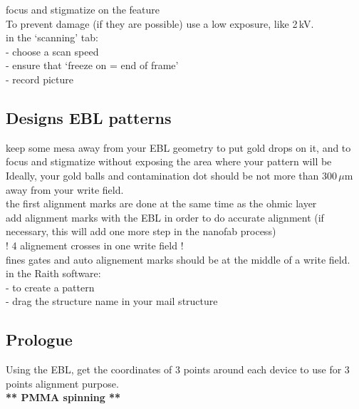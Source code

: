 \documentclass[12pt,a4paper]{report}
\begin{document}
\begin{enumerate}
focus and stigmatize on the feature\\

To prevent damage (if they are possible) use a  low exposure, like 2\,kV.\\

in the `scanning' tab:\\
- choose a scan speed\\
- ensure that `freeze on = end of frame'\\
- record picture\\


\subsection{Designs EBL patterns}

keep some mesa away from your EBL geometry to put gold drops on it, and to focus and stigmatize without exposing the area where your pattern will be\\
Ideally, your gold balls and contamination dot should be not more than 300\,$\mu$m away from your write field.\\

the first alignment marks are done at the same time as the ohmic layer\\

add alignment marks with the EBL in order to do accurate alignment (if necessary, this will add one more step in the nanofab process)\\
! 4 alignement crosses in one write field !\\

fines gates and auto alignement marks should be at the middle of a write field.\\

in the Raith software:\\
-  to create a pattern\\
- drag the structure name in your mail structure\\


\subsection{Prologue}

Using the EBL, get the coordinates of 3 points around each device to use for 3 points alignment purpose.\\

\textbf{** PMMA spinning **}\\


\end{enumerate}
\end{document}

